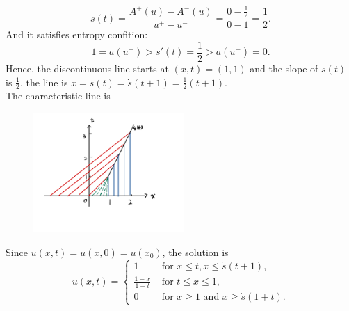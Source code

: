 \documentclass[12pt]{article}%
\begin{document}
\begin{equation*}
    \dot{s}(t)=\frac{A^{+}(u)-A^{-}(u)}{u^{+}-u^{-}}=\frac{0-\frac{1}{2}}{0-1}=\frac{1}{2}.
\end{equation*}
And it satisfies entropy confition:
\[ 1=a(u^{-})>s'(t)=\frac{1}{2}>a(u^{+})=0.\]
Hence, the discontinuous line starts at $(x,t)=(1,1)$ and the slope of $s(t)$ is $\frac{1}{2}$, the line is $x=s(t)=\dot{s}(t+1)=\frac{1}{2}(t+1)$.\\
The characteristic line is 
\begin{figure}[h]
    \centering
    \includegraphics[width=0.51\textwidth]{Graph 2.jpeg} %
    \label{fig:The second graph of characteristic lines}
  \end{figure}

Since $u(x,t)=u(x,0)=u(x_{0})$, the solution is 
\begin{equation*}u(x,t)=
    \begin{cases}
        1 & \text{ for } x \le t, x\le \dot{s}(t+1),\\
        \frac{1-x}{1-t} & \text{ for } t\le x\le 1,\\
        0 & \text{ for }  x\ge 1 \text{ and } x\ge \dot{s}(1+t).
    \end{cases}
\end{equation*}

\end{document}

